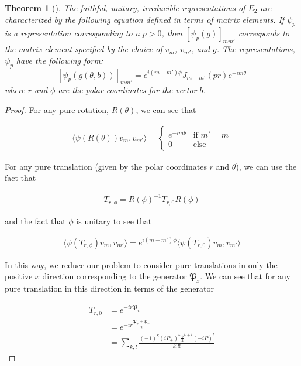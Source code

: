 \documentclass[10pt]{ucthesis}
\newtheorem{theorem}[definition]{Theorem}
\begin{document}
\begin{theorem}[\cite{Tung}]
	The faithful, unitary, irreducible representations of $E_2$ are characterized by the following equation defined in terms of matrix elements. If $\psi_p$ is a representation corresponding to a $p>0$, then $[\psi_p(g)]_{mm'}$ corresponds to the matrix element specified by the choice of $v_m$, $v_{m'}$, and $g$. The representations, $\psi_p$ have the following form:
$$[\psi_p(g(\theta,b))]_{mm'} = e^{i(m-m')\phi}J_{m-m'}(pr)e^{-im\theta}$$
where $r$ and $\phi$ are the polar coordinates for the vector $b$.
\end{theorem}
\noindent\begin{proof} For any pure rotation, $R(\theta)$, we can see that

\begin{equation}
\begin{aligned}
 \langle \psi(R(\theta))v_m , v_{m'} \rangle = \begin{cases}
																e^{-im\theta} & \text{if }m' = m\\
																0 & \text{else}
															\end{cases}
\end{aligned}
\end{equation}

For any pure translation (given by the polar coordinates $r$ and $\theta$), we can use the fact that

\begin{equation}
\begin{aligned}
	T_{r,\phi} = R(\phi)^{-1}T_{r,0}R(\phi)
\end{aligned}
\end{equation}

and the fact that $\phi$ is unitary to see that 

\begin{equation}
\begin{aligned}
 \langle \psi(T_{r,\phi})v_m , v_{m'} \rangle = e^{i(m-m')\phi}\langle \psi(T_{r,0})v_m , v_{m'} \rangle
\end{aligned}
\end{equation}

In this way, we reduce our problem to consider pure translations in only the positive $x$ direction corresponding to the generator $\mathfrak{P}_x$. We can see that for any pure translation in this direction in terms of the generator

\begin{equation}
\begin{aligned}
	 T_{r,0} &= e^{-ir\mathfrak{P}_x}\\
			&= e^{-ir\frac{\mathfrak{P}_++\mathfrak{P}_-}{2}} \\
			&= \sum_{k,l} \frac{(-1)^k(iP_+)^k\frac{b}{2}^{k+l}(-iP)^l}{k!l!}
\end{aligned}
\end{equation}


\end{proof}
\end{document}
